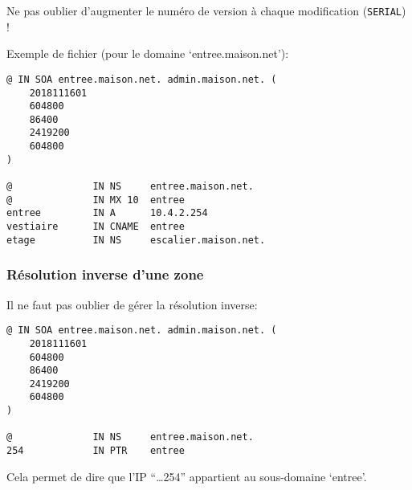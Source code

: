 \documentclass[10pt,a4paper,french]{article}
\begin{document}
Ne pas oublier d'augmenter le numéro de version à chaque modification ({\tt SERIAL}) !

Exemple de fichier (pour le domaine `entree.maison.net'):
\begin{verbatim}
@ IN SOA entree.maison.net. admin.maison.net. (
    2018111601
    604800
    86400
    2419200
    604800
)

@              IN NS     entree.maison.net.
@              IN MX 10  entree
entree         IN A      10.4.2.254
vestiaire      IN CNAME  entree
etage          IN NS     escalier.maison.net.
\end{verbatim}

\subsubsection{Résolution inverse d'une zone}

Il ne faut pas oublier de gérer la résolution inverse:
\begin{verbatim}
@ IN SOA entree.maison.net. admin.maison.net. (
    2018111601
    604800
    86400
    2419200
    604800
)

@              IN NS     entree.maison.net.
254            IN PTR    entree
\end{verbatim}
Cela permet de dire que l'IP ``\ldots 254'' appartient au sous-domaine `entree'.
\end{document}
